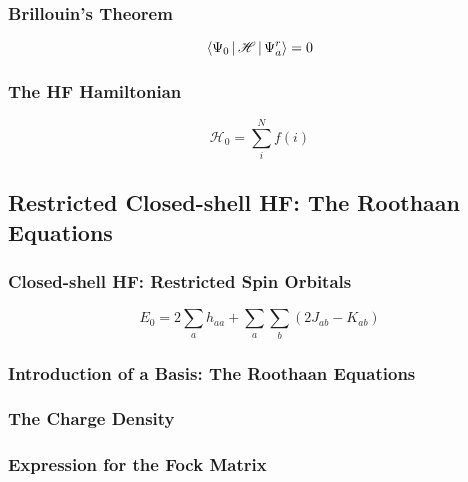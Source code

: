 \documentclass[a4paper]{article}
\numberwithin{equation}{section}
\begin{document}
\subsubsection{Brillouin's Theorem}
\begin{equation}\label{key}
\Braket{\Psi_0 | \mathscr{H} | \Psi_a^r} = 0
\end{equation}

\subsubsection{The HF Hamiltonian}
\begin{equation}\label{key}
\mathscr{H}_0 = \sum_i^N f(i) 
\end{equation}

\subsection{Restricted Closed-shell HF: The Roothaan Equations}
\subsubsection{Closed-shell HF: Restricted Spin Orbitals}
\begin{equation}\label{key}
E_0 = 2\sum_a h_{aa} + \sum_a\sum_b(2J_{ab} - K_{ab})
\end{equation}

\subsubsection{Introduction of a Basis: The Roothaan Equations}

\subsubsection{The Charge Density}

\subsubsection{Expression for the Fock Matrix}
\end{document}
